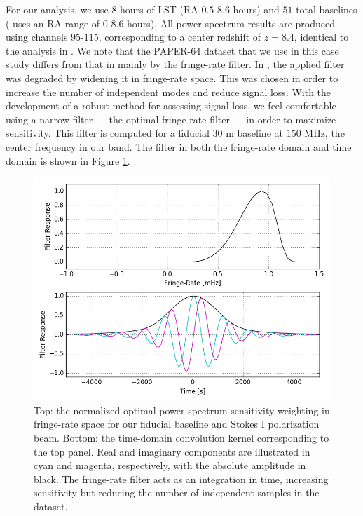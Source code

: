 \documentclass[preprint2,numberedappendix,tighten]{aastex6}  %
\begin{document}
For our analysis, we use $8$ hours of LST (RA $0.5$-$8.6$ hours) and $51$ total baselines (\citet{ali_et_al2015} uses an RA range of $0$-$8.6$ hours). All power spectrum results are produced using channels $95$-$115$, corresponding to a center redshift of $z=8.4$, identical to the analysis in \citet{ali_et_al2015}. We note that the PAPER-64 dataset that we use in this case study differs from that in \citet{ali_et_al2015} mainly by the fringe-rate filter. In \citet{ali_et_al2015}, the applied filter was degraded by widening it in fringe-rate space. This was chosen in order to increase the number of independent modes and reduce signal loss. With the development of a robust method for assessing signal loss, we feel comfortable using a narrow filter --- the optimal fringe-rate filter --- in order to maximize sensitivity. This filter is computed for a fiducial $30$ m baseline at $150$ MHz, the center frequency in our band. The filter in both the fringe-rate domain and time domain is shown in Figure \ref{fig:frp}.

\begin{figure}
	\centering
	\includegraphics[width=\columnwidth]{plots/frp.png}
	\caption{Top: the normalized optimal power-spectrum sensitivity weighting in fringe-rate space for our fiducial baseline and Stokes I polarization beam. Bottom: the time-domain convolution kernel corresponding to the top panel. Real and imaginary components are illustrated in cyan and magenta, respectively, with the absolute amplitude in black. The fringe-rate filter acts as an integration in time, increasing sensitivity but reducing the number of independent samples in the dataset.}
	\label{fig:frp}
\end{figure}
\end{document}
